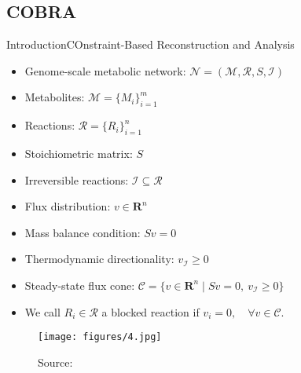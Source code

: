 \documentclass[10pt]{beamer}
\theoremstyle{remark}
\theoremstyle{definition}
\begin{document}
\subsection{COBRA}
\begin{frame}{Introduction}{COnstraint-Based Reconstruction and Analysis}
\noindent
\begin{minipage}[t]{.49\textwidth}
\raggedright
  \begin{itemize}
    \item<2-> Genome-scale metabolic network: $\mathcal{N} = (\mathcal{M}, \mathcal{R}, S, \mathcal{I})$
    \item<3-> Metabolites: $\mathcal{M} = \{M_i\}_{i=1}^m$
    \item<4-> Reactions: $\mathcal{R} = \{R_i\}_{i=1}^n$
    \item<5-> Stoichiometric matrix: $S$
    \item<6-> Irreversible reactions: $\mathcal{I} \subseteq \mathcal{R}$
    \item<7-> Flux distribution: $v\in\mathbf{R}^n$ 
	\item<8-> Mass balance condition: $Sv = 0$
    \item<9-> Thermodynamic directionality: $v_\mathcal{I} \geq 0$
    \item<10-> Steady-state flux cone: $\mathcal{C} = \{v \in \mathbf{R}^n \mid Sv=0,~ v_\mathcal{I} \geq 0\}$
    \item<11-> We call $R_i\in\mathcal{R}$ a blocked reaction if $v_i = 0,\quad\forall v\in\mathcal{C}$.
  \end{itemize}
\end{minipage}
\hfill
\begin{minipage}[t]{.49\textwidth}
\raggedleft
\begin{figure}[ht]
    \centering
    \texttt{[image: figures/4.jpg]}
    \caption{Source: \cite{kim2012recent}}
  \end{figure}
\end{minipage}
\end{frame}

\end{document}
